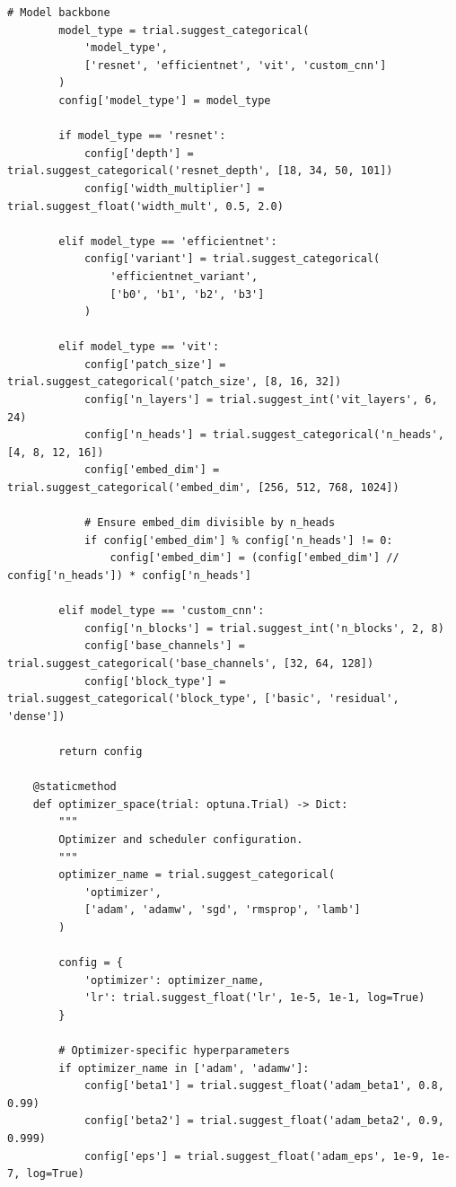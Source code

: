 \begin{lstlisting}[style=python, caption=Search space design patterns]
        # Model backbone
        model_type = trial.suggest_categorical(
            'model_type',
            ['resnet', 'efficientnet', 'vit', 'custom_cnn']
        )
        config['model_type'] = model_type

        if model_type == 'resnet':
            config['depth'] = trial.suggest_categorical('resnet_depth', [18, 34, 50, 101])
            config['width_multiplier'] = trial.suggest_float('width_mult', 0.5, 2.0)

        elif model_type == 'efficientnet':
            config['variant'] = trial.suggest_categorical(
                'efficientnet_variant',
                ['b0', 'b1', 'b2', 'b3']
            )

        elif model_type == 'vit':
            config['patch_size'] = trial.suggest_categorical('patch_size', [8, 16, 32])
            config['n_layers'] = trial.suggest_int('vit_layers', 6, 24)
            config['n_heads'] = trial.suggest_categorical('n_heads', [4, 8, 12, 16])
            config['embed_dim'] = trial.suggest_categorical('embed_dim', [256, 512, 768, 1024])

            # Ensure embed_dim divisible by n_heads
            if config['embed_dim'] % config['n_heads'] != 0:
                config['embed_dim'] = (config['embed_dim'] // config['n_heads']) * config['n_heads']

        elif model_type == 'custom_cnn':
            config['n_blocks'] = trial.suggest_int('n_blocks', 2, 8)
            config['base_channels'] = trial.suggest_categorical('base_channels', [32, 64, 128])
            config['block_type'] = trial.suggest_categorical('block_type', ['basic', 'residual', 'dense'])

        return config

    @staticmethod
    def optimizer_space(trial: optuna.Trial) -> Dict:
        """
        Optimizer and scheduler configuration.
        """
        optimizer_name = trial.suggest_categorical(
            'optimizer',
            ['adam', 'adamw', 'sgd', 'rmsprop', 'lamb']
        )

        config = {
            'optimizer': optimizer_name,
            'lr': trial.suggest_float('lr', 1e-5, 1e-1, log=True)
        }

        # Optimizer-specific hyperparameters
        if optimizer_name in ['adam', 'adamw']:
            config['beta1'] = trial.suggest_float('adam_beta1', 0.8, 0.99)
            config['beta2'] = trial.suggest_float('adam_beta2', 0.9, 0.999)
            config['eps'] = trial.suggest_float('adam_eps', 1e-9, 1e-7, log=True)


\end{lstlisting}
